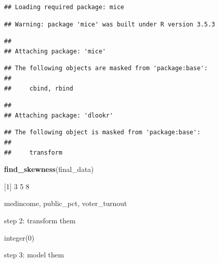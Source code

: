 \documentclass[
]{article}
\newenvironment{Shaded}{\begin{snugshade}}{\end{snugshade}}
\newcommand{\DataTypeTok}[1]{\textcolor[rgb]{0.13,0.29,0.53}{#1}}
\newcommand{\FloatTok}[1]{\textcolor[rgb]{0.00,0.00,0.81}{#1}}
\newcommand{\KeywordTok}[1]{\textcolor[rgb]{0.13,0.29,0.53}{\textbf{#1}}}
\newcommand{\NormalTok}[1]{#1}
\newcommand{\OperatorTok}[1]{\textcolor[rgb]{0.81,0.36,0.00}{\textbf{#1}}}
\newcommand{\StringTok}[1]{\textcolor[rgb]{0.31,0.60,0.02}{#1}}
\begin{document}
\begin{verbatim}
## Loading required package: mice
\end{verbatim}

\begin{verbatim}
## Warning: package 'mice' was built under R version 3.5.3
\end{verbatim}

\begin{verbatim}
## 
## Attaching package: 'mice'
\end{verbatim}

\begin{verbatim}
## The following objects are masked from 'package:base':
## 
##     cbind, rbind
\end{verbatim}

\begin{verbatim}
## 
## Attaching package: 'dlookr'
\end{verbatim}

\begin{verbatim}
## The following object is masked from 'package:base':
## 
##     transform
\end{verbatim}

\begin{Shaded}
\begin{Highlighting}[]
\KeywordTok{find_skewness}\NormalTok{(final_data)}
\end{Highlighting}
\end{Shaded}

{[}1{]} 3 5 8

medincome, public\_pct, voter\_turnout

step 2: transform them

\begin{Shaded}
\end{Shaded}

integer(0)

step 3: model them
\end{document}
